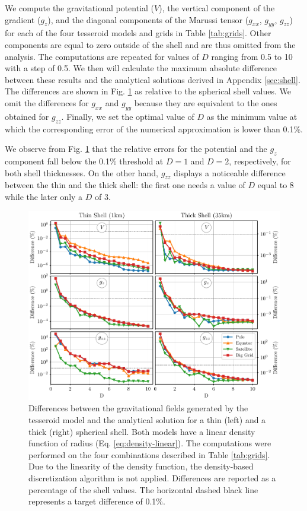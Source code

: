 \documentclass[extra]{gji}
\begin{document}
We compute the gravitational potential ($V$), the vertical component of the gradient
($g_z$), and the diagonal components of the Marussi tensor ($g_{xx}$, $g_{yy}$,
$g_{zz}$) for each of the four tesseroid models and grids in Table
\ref{tab:grids}.
Other components are equal to zero outside of the shell and are thus omitted from the
analysis.
The computations are repeated for values of $D$ ranging from 0.5 to 10 with a step of
0.5.
We then will calculate the maximum absolute difference between these results and the
analytical solutions derived in Appendix \ref{sec:shell}.
The differences are shown in Fig. \ref{fig:D-linear} as relative to the spherical shell
values.
We omit the differences for $g_{xx}$ and $g_{yy}$ because they are equivalent to the
ones obtained for $g_{zz}$.
Finally, we set the optimal value of $D$ as the minimum value at which the corresponding
error of the numerical approximation is lower than 0.1\%.

We observe from Fig. \ref{fig:D-linear} that the relative errors for the
potential and the $g_z$ component fall below the 0.1\% threshold at
$D=1$ and $D=2$, respectively, for both shell thicknesses.
On the other hand, $g_{zz}$ displays a noticeable
difference between the thin and the thick shell: the first one needs a
value of $D$ equal to 8 while the later only a $D$ of 3.

\begin{figure}
\centering
\includegraphics[width=\linewidth]{figures/linear-D.pdf}
\caption{
    Differences between the gravitational fields generated by the tesseroid model
    and the analytical solution for a thin (left) and a thick (right) spherical shell.
    Both models have a linear density function of radius (Eq. \ref{eq:density-linear}).
    The computations were performed on the four combinations described in
    Table \ref{tab:grids}.
    Due to the linearity of the density function, the density-based discretization
    algorithm is not applied.
    Differences are reported as a percentage of the shell values.
    The horizontal dashed black line represents a target difference of 0.1\%.
}
\label{fig:D-linear}
\end{figure}
\end{document}
